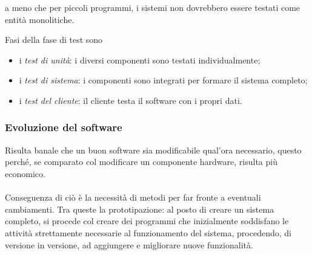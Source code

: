 \documentclass{subfiles}
\begin{document}
\begin{Remark*}
    a meno che per piccoli programmi, i sistemi non dovrebbero essere testati come entità monolitiche.
\end{Remark*}

\noindent Fasi della fase di test sono
\begin{itemize}
    \item i \emph{test di unità}: i diversi componenti sono testati individualmente;
    \item i \emph{test di sistema}: i componenti sono integrati per formare il sistema completo;
    \item i \emph{test del cliente}: il cliente testa il software con i propri dati.
\end{itemize}

\subsubsection{Evoluzione del software}
Risulta banale che un buon software sia modificabile qual'ora necessario, questo perché, se comparato col modificare un componente hardware, risulta più economico.
\\ \\
Conseguenza di ciò è la necessità di metodi per far fronte a eventuali cambiamenti.
Tra queste la prototipazione: al posto di creare un sistema completo, si procede col creare dei programmi che inizialmente soddisfano le attività strettamente necessarie al funzionamento del sistema,
procedendo, di versione in versione, ad aggiungere e migliorare nuove funzionalità.
\end{document}
